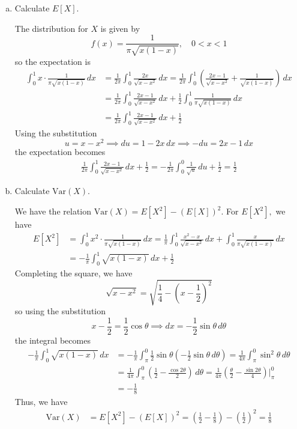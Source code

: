 \documentclass{article}
\newcommand{\var}{\mathrm{Var}}
\begin{document}
\begin{enumerate}[(1)]
\begin{enumerate}[(a)]
			\item Calculate $E[X].$
				\begin{soln}
					The distribution for $X$ is given by
					\[f(x) = \frac{1}{\pi\sqrt{x(1-x)}}, \quad 0<x<1\]
					so the expectation is
					\begin{align*}
						\int_0^1 x\cdot\frac{1}{\pi\sqrt{x(1-x)}}\, dx &= \frac{1}{2\pi}\int_0^1 \frac{2x}{\sqrt{x-x^2}}\, dx = \frac{1}{2\pi}\int_0^1 \left(\frac{2x-1}{\sqrt{x-x^2}}+\frac{1}{\sqrt{x(1-x)}}\right)\, dx \\
						&= \frac{1}{2\pi}\int_0^1 \frac{2x-1}{\sqrt{x-x^2}}\, dx + \frac{1}{2}\int_0^1 \frac{1}{\pi\sqrt{x(1-x)}}\, dx \\
						&= \frac{1}{2\pi}\int_0^1\frac{2x-1}{\sqrt{x-x^2}}\, dx + \frac{1}{2}
					\end{align*}
					Using the substitution
					\[u=x-x^2\implies du=1-2x\, dx\implies -du=2x-1\, dx\]
					the expectation becomes
					\begin{align*}
						\frac{1}{2\pi}\int_0^1 \frac{2x-1}{\sqrt{x-x^2}}\, dx + \frac{1}{2} = -\frac{1}{2\pi}\int_0^0 \frac{1}{\sqrt{u}}\, du + \frac{1}{2} = \boxed{\frac{1}{2}}
					\end{align*}
				\end{soln}

			\item Calculate $\var(X).$
				\begin{soln}
					We have the relation $\var(X)=E[X^2]-(E[X])^2.$ For $E[X^2],$ we have
					\begin{align*}
						E[X^2] &= \int_0^1 x^2\cdot\frac{1}{\pi\sqrt{x(1-x)}}\, dx = \frac{1}{\pi}\int_0^1 \frac{x^2-x}{\sqrt{x-x^2}}\, dx + \int_0^1 \frac{x}{\pi\sqrt{x(1-x)}}\, dx \\
						&= -\frac{1}{\pi}\int_0^1 \sqrt{x(1-x)}\, dx + \frac{1}{2}
					\end{align*}
					Completing the square, we have
					\[\sqrt{x-x^2} = \sqrt{\frac{1}{4}-\left( x-\frac{1}{2} \right)^2}\]
					so using the substitution
					\[x-\frac{1}{2} = \frac{1}{2}\cos\theta\implies dx = -\frac{1}{2}\sin\theta\, d\theta\]
					the integral becomes
					\begin{align*}
						-\frac{1}{\pi}\int_0^1 \sqrt{x(1-x)}\, dx &= -\frac{1}{\pi}\int_\pi^0 \frac{1}{2}\sin\theta \left( -\frac{1}{2}\sin\theta\, d\theta \right) = \frac{1}{4\pi}\int_\pi^0\sin^2\theta\, d\theta \\
						&= \frac{1}{4\pi}\int_\pi^0\left(\frac{1}{2} - \frac{\cos2\theta}{2}\right)\, d\theta = \frac{1}{4\pi}\left( \frac{\theta}{2} - \frac{\sin2\theta}{4} \right)\bigg\vert^0_\pi \\
						&= -\frac{1}{8}
					\end{align*}
					Thus, we have
					\begin{align*}
						\var(X) &= E[X^2]-(E[X])^2 = \left( \frac{1}{2}-\frac{1}{8} \right) - \left(\frac{1}{2}\right)^2 = \boxed{\frac{1}{8}}
					\end{align*}
				\end{soln}
				

\end{enumerate}
\end{enumerate}
\end{document}
